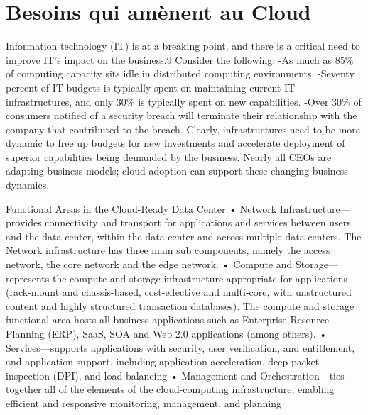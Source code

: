 
\section{Besoins qui amènent au Cloud}

Information technology (IT) is at a breaking point, and there is a critical need to improve IT's impact on the business.9
Consider the following:
 -As much as 85\% of computing capacity sits idle in distributed computing environments.
 -Seventy percent of IT budgets is typically spent on maintaining current IT infrastructures, and only 30\% is typically spent on new capabilities.
 -Over 30\% of consumers notified of a security breach will terminate their relationship with the company that contributed to the breach.
Clearly, infrastructures need to be more dynamic to free up budgets for new investments and accelerate deployment of superior capabilities being demanded by the business. Nearly all CEOs are adapting business models; cloud adoption can support these changing business dynamics.

Functional Areas in the Cloud-Ready Data Center
• Network Infrastructure—provides connectivity and transport for applications and services between users and the data center, within the data center and across multiple data centers. The Network infrastructure has three main sub components, namely the access network, the core network and the edge network.
• Compute and Storage—represents the compute and storage infrastructure appropriate for applications (rack-mount and chassis-based, cost-effective and multi-core, with unstructured content and highly structured transaction databases). The compute and storage functional area hosts all business applications such as Enterprise Resource Planning (ERP), SaaS, SOA and Web 2.0 applications (among others).
• Services—supports applications with security, user verification, and entitlement, and application support, including application acceleration, deep packet inspection (DPI), and load balancing
• Management and Orchestration—ties together all of the elements of the cloud-computing infrastructure, enabling efficient and responsive monitoring, management, and planning

